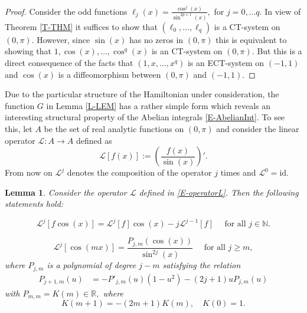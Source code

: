 \documentclass[12pt,psamsfonts]{amsart}
\newtheorem {lemma}  [theorem]{Lemma}
\begin{document}
\begin{proof} Consider the odd functions $\ell_j(x)=\frac{\cos^j(x)}{\sin^{2p+1}(x)},$
for $j=0,\dots q$. In view of
Theorem \ref{T-THM} it suffices to show that $(\ell_0,\dots,
\ell_{q})$ is a CT-system on $(0,\pi).$ However, since $\sin (x)$
has no zeros in $(0,\pi)$ this is equivalent to showing that
$1,\cos(x),\ldots,\cos^q(x)$ is an CT-system on $(0,\pi).$ But this
is a direct consequence of the facts that $(1,x,\ldots,x^q)$ is an
ECT-system on $(-1,1)$ and $\cos(x)$ is a diffeomorphism between
$(0,\pi)$ and $(-1,1).$
\end{proof}

Due to the particular structure of the Hamiltonian under
consideration, the function $G$ in   Lemma \ref{L-LEM}  has a rather
simple form which reveals an interesting structural property of the
Abelian integrals \eqref{E-AbelianInt}. To see this,  let $A$ be
the set of real analytic functions on $(0,\pi)$  and consider the
linear operator ${\mathscr{L}}: A \longrightarrow A$ defined as
\begin{equation}
 \label{E-operatorL}
     {\mathscr{L}}[f(x)] :=\left (\frac{f(x)}{\sin(x)}\right)'.
\end{equation}
From now on  ${\mathscr{L}}^j$ denotes the composition of the operator $j$
times and ${\mathscr{L}}^0={\text{id}}$.

\begin{lemma}
\label{L-operatorL} Consider the operator ${\mathscr{L}}$ defined in \eqref{E-operatorL}.  Then the following
statements hold:

\begin{equation}
    \label{E-Lj}
    {\mathscr{L}}^j[f \cos(x)] = {\mathscr{L}}^j[f]\cos(x) - j{\mathscr{L}}^{j-1}[f]\quad \text{ for all } j\in{\mathbb{N}}. \tag{A}
\end{equation}

\begin{equation}
    \label{E-Ljm}
         {\mathscr{L}}^j[\cos(mx)] = \dfrac{P_{j,m}(\cos(x))}{\sin^{2j}(x)} \quad \text{ for all }
          j\geq m, \tag{B}
    \end{equation}
 where $P_{j,m}$ is a polynomial of degree $j-m$ satisfying the relation
    \begin{align}
    \label{E-Pjm}
        P_{j+1,m}(u) & = -P'_{j,m}(u) (1-u^2)-(2j+1)uP_{j,m}(u)
    \end{align}
with $P_{m,m} = K(m) \in {\mathbb{R}},$ where
\begin{equation}
\label{E-Km}
    K(m+1) = -(2m+1) K(m), \quad K(0)=1.
\end{equation}
\end{lemma}
\end{document}
